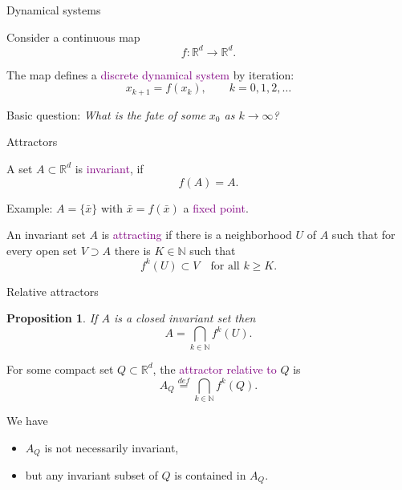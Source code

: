 \documentclass[]{beamer}
\newtheorem{proposition}{Proposition}
\newcommand{\R}{{\mathbb R}}
\newcommand{\N}{{\mathbb N}}
\renewcommand{\emph}[1]{\textcolor{purple}{#1}}
\begin{document}
\begin{frame}{Dynamical systems}

Consider a continuous map
\[
f:\R^d\to \R^d.
\] 

The map defines a \emph{discrete dynamical system} by iteration:
\[
x_{k+1} = f(x_k), \qquad k=0,1,2,\ldots
\]

\begin{tcolorbox}[colback=blue!5!white,colframe=blue!75!black]
Basic question: \textit{What is the fate of some $x_0$ as $k\to\infty$?}
\end{tcolorbox}



\end{frame}

\begin{frame}{Attractors}

\begin{definition}
    A set $A\subset\R^d$ is \emph{invariant}, if
    \[
    f(A)=A.
    \]
\end{definition}

\begin{tcolorbox}[colback=blue!5!white,colframe=blue!75!black]
Example: $A=\{\bar x\}$ with $\bar x = f(\bar x)$ a \emph{fixed point}.
\end{tcolorbox}


\begin{definition}
    An invariant set $A$ is \emph{attracting} if there is a neighborhood $U$ of $A$ such that for every open set $V\supset A$ there is $K\in\N$ such that
    \[
    f^k(U)\subset V \quad\text{for all } k\ge K.
    \]
\end{definition}

\end{frame}

\begin{frame}{Relative attractors}

\begin{proposition}
    If $A$ is a closed invariant set then
    \[
    A = \bigcap_{k\in\N} f^k(U).
    \]
\end{proposition}

\begin{definition}
    For some compact set $Q\subset\R^d$, the \emph{attractor relative to} $Q$ is
    \[
    A_Q \overset{def}{=} \bigcap_{k\in\N} f^k(Q).
    \]    
\end{definition}

We have
\begin{itemize}
    \item $A_Q$ is not necessarily invariant,
    \item but any invariant subset of $Q$ is contained in $A_Q$.  
\end{itemize}

\end{frame}
\end{document}
